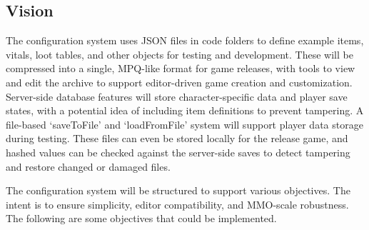 \subsection{Vision}
The configuration system uses JSON files in code folders to define example items, vitals, loot tables, and other objects for testing and development. These will be compressed into a single, MPQ-like format for game releases, with tools to view and edit the archive to support editor-driven game creation and customization. Server-side database features will store character-specific data and player save states, with a potential idea of including item definitions to prevent tampering. A file-based `saveToFile' and `loadFromFile' system will support player data storage during testing. These files can even be stored locally for the release game, and hashed values can be checked against the server-side saves to detect tampering and restore changed or damaged files.

The configuration system will be structured to support various objectives. The intent is to ensure simplicity, editor compatibility, and MMO-scale robustness. The following are some objectives that could be implemented.

